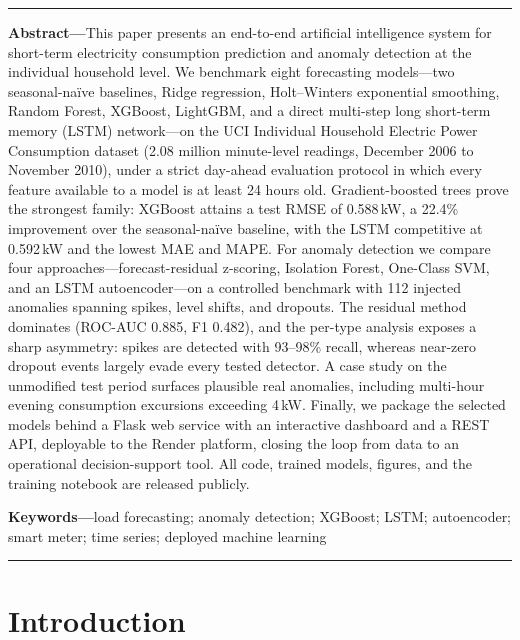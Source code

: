 \documentclass[10pt,a4paper]{article}
\begin{document}
\noindent\rule{\textwidth}{0.4pt}
\begin{center}
\begin{minipage}{0.92\textwidth}
\small
\textbf{Abstract---}This paper presents an end-to-end artificial intelligence system for
short-term electricity consumption prediction and anomaly detection at the individual
household level. We benchmark eight forecasting models---two seasonal-na\"ive baselines,
Ridge regression, Holt--Winters exponential smoothing, Random Forest, XGBoost, LightGBM,
and a direct multi-step long short-term memory (LSTM) network---on the UCI Individual
Household Electric Power Consumption dataset (2.08 million minute-level readings,
December 2006 to November 2010), under a strict day-ahead evaluation protocol in which
every feature available to a model is at least 24 hours old. Gradient-boosted trees
prove the strongest family: XGBoost attains a test RMSE of 0.588\,kW, a 22.4\%
improvement over the seasonal-na\"ive baseline, with the LSTM competitive at 0.592\,kW
and the lowest MAE and MAPE. For anomaly detection we compare four
approaches---forecast-residual z-scoring, Isolation Forest, One-Class SVM, and an LSTM
autoencoder---on a controlled benchmark with 112 injected anomalies spanning spikes,
level shifts, and dropouts. The residual method dominates (ROC-AUC 0.885, F1 0.482),
and the per-type analysis exposes a sharp asymmetry: spikes are detected with
93--98\% recall, whereas near-zero dropout events largely evade every tested detector.
A case study on the unmodified test period surfaces plausible real anomalies, including
multi-hour evening consumption excursions exceeding 4\,kW. Finally, we package the
selected models behind a Flask web service with an interactive dashboard and a REST
API, deployable to the Render platform, closing the loop from data to an operational
decision-support tool. All code, trained models, figures, and the training notebook are
released publicly.

\vspace{4pt}
\textbf{Keywords---}load forecasting; anomaly detection; XGBoost; LSTM; autoencoder;
smart meter; time series; deployed machine learning
\end{minipage}
\end{center}
\noindent\rule{\textwidth}{0.4pt}
\vspace{6pt}

\section{Introduction}\label{sec:intro}
\end{document}
